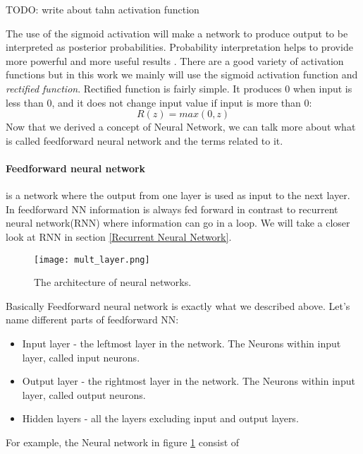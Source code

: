 TODO: write about tahn activation function

The use of the sigmoid activation will make a network to produce output to be
interpreted as posterior probabilities. Probability interpretation helps to provide
more powerful and more useful results \cite{Bishop1995}. There are a good variety
of activation functions but in this work we mainly will use the sigmoid activation function
and \emph{rectified function}. Rectified function is fairly simple.
It produces $0$ when input is less than $0$, and it does not change input value if
input is more than 0:
\begin{equation} \label{rect_function}
	R(z) = max(0, z)
\end{equation}
Now that we derived a concept of Neural Network, we can talk more about
what is called feedforward neural network and the terms related to it.
\paragraph{Feedforward neural network} is a network where the output
from one layer is used as input to the next layer. In feedforward NN
information is always fed forward in contrast to recurrent neural network(RNN)
where information can go in a loop. We will take a closer look at RNN in section
\ref{Recurrent Neural Network}.

\begin{figure}[H]
	\texttt{[image: mult\_layer.png]}
	\caption{The architecture of neural networks\cite{Nielsen2015}.} %
	\label{img:mult_layer} %
\end{figure}

Basically Feedforward neural network is exactly
what we described above. Let's name different parts of feedforward NN:

\begin{itemize}
	\item Input layer - the leftmost layer in the network. The Neurons within
		input layer, called input neurons.
	\item Output layer - the rightmost layer in the network. The Neurons within
		input layer, called output neurons.
	\item Hidden layers - all the layers excluding input and output layers.
\end{itemize}

For example, the Neural network in figure \ref{img:mult_layer} consist of

